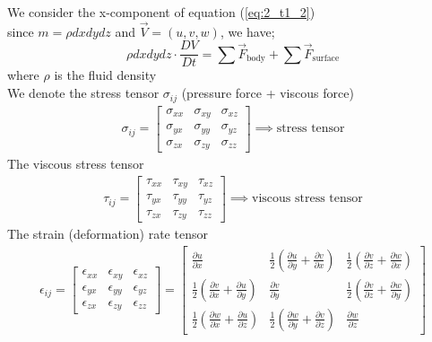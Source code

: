 \documentclass[11pt]{report}
\newcommand{\sps}{\\[0.2cm]}
\newcommand{\refn}[1]{(\ref{#1})}
\newcommand{\refx}[1]{\refn{eq:#1}}
\newcommand{\NI}{\noindent}
\begin{document}
	\NI We consider the x-component of equation \refx{2_t1_2}\\
	since $m=\rho dx dy dz$ and $\vec{V} = (u,v,w)$, we have;
	\begin{equation}
		\rho dx dy dz \cdot \frac{DV}{Dt} = \sum \vec{F}_{\text{body}} + \sum \vec{F}_{\text{surface}}\tag{3}\label{eq:2_t1_3}
	\end{equation}
	where $\rho$ is the fluid density\\
	We denote the stress tensor $\sigma_{ij}$ (pressure force + viscous force)
	\begin{eqnarray*}
		\sigma_{ij} = \begin{bmatrix}
			\sigma_{xx} & \sigma_{xy} &\sigma_{xz}\sps
			\sigma_{yx} & \sigma_{yy} & \sigma_{yz}\sps
			\sigma_{zx} & \sigma_{zy} & \sigma_{zz}
		\end{bmatrix} \implies \text{stress tensor}
	\end{eqnarray*}
	The viscous stress tensor
	\begin{eqnarray*}
		\tau_{ij} = \begin{bmatrix}
			\tau_{xx} & \tau_{xy} &\tau_{xz}\sps
			\tau_{yx} & \tau_{yy} & \tau_{yz}\sps
			\tau_{zx} & \tau_{zy} & \tau_{zz}
		\end{bmatrix} \implies \text{viscous stress tensor}
	\end{eqnarray*}
	The strain (deformation) rate tensor
	\begin{eqnarray*}
		\epsilon_{ij} = \begin{bmatrix}
			\epsilon_{xx} & \epsilon_{xy} &\epsilon_{xz}\sps
			\epsilon_{yx} & \epsilon_{yy} & \epsilon_{yz}\sps
			\epsilon_{zx} & \epsilon_{zy} & \epsilon_{zz}
		\end{bmatrix} = 
						\begin{bmatrix}
							\frac{\partial u}{\partial x} & \frac{1}{2}\left(\frac{\partial u}{\partial y} + \frac{\partial v}{\partial x}\right) & \frac{1}{2}\left(\frac{\partial v}{\partial z}+ \frac{\partial w}{\partial x}\right)\sps
							\frac{1}{2}\left(\frac{\partial v}{\partial x}+ \frac{\partial u}{\partial y}\right) & \frac{\partial v}{\partial y} & \frac{1}{2}\left(\frac{\partial v}{\partial z}+ \frac{\partial w}{\partial y}\right)\sps
							\frac{1}{2}\left(\frac{\partial w}{\partial x}+ \frac{\partial u}{\partial z}\right) & \frac{1}{2}\left(\frac{\partial w}{\partial y}+ \frac{\partial v}{\partial z}\right) & \frac{\partial w}{\partial z}
						\end{bmatrix}
	\end{eqnarray*}
	
\end{document}
